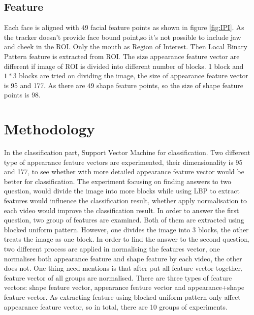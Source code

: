 \subsection{Feature}
Each face is aligned with 49 facial feature points as shown in figure \ref{fig:IPI}. As the tracker doesn't provide face bound point,so it's not possible to include jaw and cheek in the ROI.  Only the mouth as Region of Interest. Then Local Binary Pattern feature is extracted from ROI. The size appearance feature vector are different if image of ROI is divided into different number of blocks. 1 block and $1*3$ blocks are tried on dividing the image, the size of appearance feature vector is 95 and 177. As there are 49 shape feature points, so the size of shape feature points is 98.
\section{Methodology}
In the classification part, Support Vector Machine for classification. Two different type of appearance feature vectors are experimented, their dimensionality is 95 and 177, to see whether with more detailed appearance feature vector would be better for classification. The experiment focusing on finding answers to two question, would divide the image into more blocks while using LBP to extract features would influence the classification result, whether apply normalisation to each video would improve the classification result. In order to answer the first question, two group of features are examined. Both of them are extracted using blocked uniform pattern. However, one divides the image into 3 blocks, the other treats the image as one block. In order to find the answer to the second question, two different process are applied in normalising the features vector, one normalises both appearance feature and shape feature by each video, the other does not. One thing need mentions is that after put all feature vector together, feature vector of all groups are normalised. There are three types of feature vectors: shape feature vector, appearance feature vector and appearance+shape feature vector. As extracting feature using blocked uniform pattern only affect appearance feature vector, so in total, there are 10 groups of experiments.

